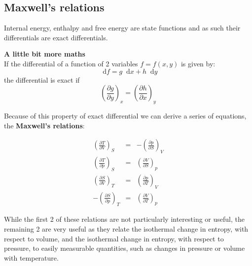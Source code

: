 \documentclass[12pt,a4paper]{report}
\newcommand*\diff{\mathop{}\!\mathrm{d}}
\newif\ifstudents
\begin{document}
   \subsection*{Maxwell's relations}
   Internal energy, enthalpy and free energy are state functions and as such their differentials  are exact differentials.
   \begin{mdframed}
   \textbf{A little bit more maths}\\
   If the differential of a function of 2 variables  $f=f(x,y)$ is given by:
   \begin{equation*}
   \diff f= g \diff x + h \diff y
   \end{equation*}
   the differential is exact if 
   \begin{equation*}
   \left(\frac{\partial g}{\partial y}\right)_{x} = \left(\frac{\partial h}{\partial x}\right)_{y}
   \end{equation*}
   \end{mdframed}
   Because of this property of exact differential we can derive a series of equations, the \textbf{Maxwell's relations}:
   \ifstudents \hideit[2]{ \fi
   \begin{eqnarray*}
   \left(\frac{\partial T}{\partial V}\right)_{S}&=&-\left(\frac{\partial p}{\partial S}\right)_{V}\\ 
   \left(\frac{\partial T}{\partial p}\right)_{S}&=&\left(\frac{\partial V}{\partial S}\right)_{p}\\
   \left(\frac{\partial S}{\partial V}\right)_{T}&=&\left(\frac{\partial p}{\partial T}\right)_{V}\\
   -\left(\frac{\partial S}{\partial p}\right)_{T}&=&\left(\frac{\partial V}{\partial T}\right)_{p}
   \end{eqnarray*} 
   \ifstudents } \fi
   While the first 2 of these relations are not particularly interesting or useful, the remaining 2 are very useful as they relate the isothermal change in entropy, with respect to volume, and the isothermal change in entropy, with respect to pressure, to easily measurable quantities, such as changes in pressure or volume with temperature. 
\end{document}
